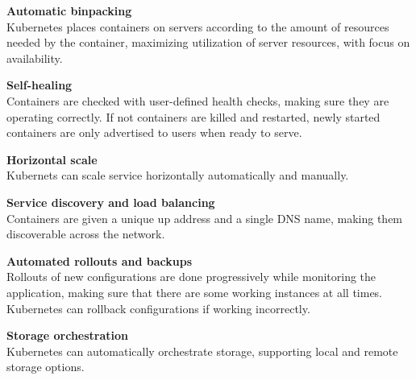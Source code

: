 \textbf{Automatic binpacking}\\
Kubernetes places containers on servers according to the amount of resources needed by the container, maximizing utilization of server resources, with focus on availability.

\textbf{Self-healing}\\
Containers are checked with user-defined health checks, making sure they are operating correctly. If not containers are killed and restarted, newly started containers are only advertised to users when ready to serve.

\textbf{Horizontal scale}\\
Kubernets can scale service horizontally automatically and manually.

\textbf{Service discovery and load balancing}\\
Containers are given a unique up address and a single DNS name, making them discoverable across the network.

\textbf{Automated rollouts and backups}\\
Rollouts of new configurations are done progressively while monitoring the application, making sure that there are some working instances at all times. Kubernetes can rollback configurations if working incorrectly.

\textbf{Storage orchestration}\\
Kubernetes can automatically orchestrate storage, supporting local and remote storage options.

